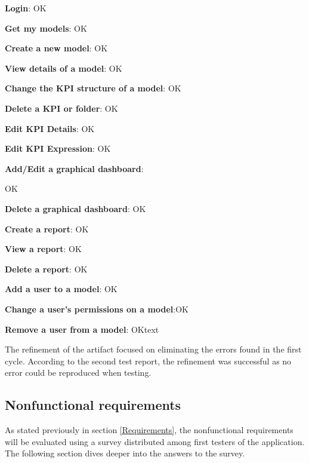 \begin{itemize}
    \item \textbf{Login}: \textcolor{mutedGreen}{OK}
    \item \textbf{Get my models}: \textcolor{mutedGreen}{OK}
    \item \textbf{Create a new model}: \textcolor{mutedGreen}{OK}
    \item \textbf{View details of a model}: \textcolor{mutedGreen}{OK}
    \item \textbf{Change the KPI structure of a model}: \textcolor{mutedGreen}{OK}
    \item \textbf{Delete a KPI or folder}: \textcolor{mutedGreen}{OK}
    \item \textbf{Edit KPI Details}: \textcolor{mutedGreen}{OK}
    \item \textbf{Edit KPI Expression}: \textcolor{mutedGreen}{OK}
    \item \textbf{Add/Edit a graphical dashboard}: \textcolor{mutedGreen}{OK
    \item \textbf{Delete a graphical dashboard}: \textcolor{mutedGreen}{OK}
    \item \textbf{Create a report}: \textcolor{mutedGreen}{OK}
    \item \textbf{View a report}: \textcolor{mutedGreen}{OK}
    \item \textbf{Delete a report}: \textcolor{mutedGreen}{OK}
    \item \textbf{Add a user to a model}: \textcolor{mutedGreen}{OK}
    \item \textbf{Change a user's permissions on a model}:\textcolor{mutedGreen}{OK}
    \item \textbf{Remove a user from a model}: \textcolor{mutedGreen}{OK}text}
\end{itemize}

The refinement of the artifact focused on eliminating the errors found in the first cycle. According to the second test report, the refinement was successful as no error could be reproduced when testing.

\subsection{Nonfunctional requirements}

As stated previously in section \ref{Requirements}, the nonfunctional requirements will be evaluated using a survey distributed among first testers of the application. The following section dives deeper into the answers to the survey. 

